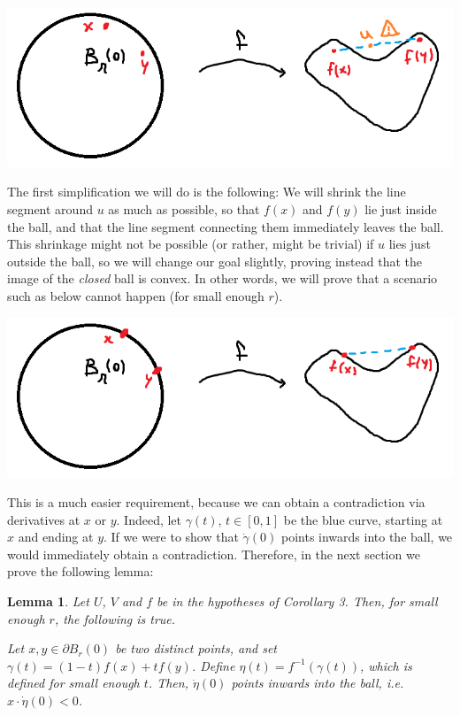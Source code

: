 \documentclass{article}
\newtheorem{lemma}{Lemma}
\theoremstyle{nonumberplain}
\newcommand{\corthree}{Corollary 3}
\begin{document}
\includegraphics[width=\linewidth]{c3i1}

The first simplification we will do is the following: We will shrink the line segment around $u$ as much as possible, so that $f(x)$ and $f(y)$ lie just inside the ball, and that the line segment connecting them immediately leaves the ball. This shrinkage might not be possible (or rather, might be trivial) if $u$ lies just outside the ball, so we will change our goal slightly, proving instead that the image of the \emph{closed} ball is convex. In other words, we will prove that a scenario such as below cannot happen (for small enough $r$).

\includegraphics[width=\linewidth]{c3i2}

This is a much easier requirement, because we can obtain a contradiction via derivatives at $x$ or $y$. Indeed, let $\gamma(t)$, $t \in [0,1]$ be the blue curve, starting at $x$ and ending at $y$. If we were to show that $\dot\gamma(0)$ points inwards into the ball, we would immediately obtain a contradiction. Therefore, in the next section we prove the following lemma:

\begin{lemma}\label{gointoball}
Let $U$, $V$ and $f$ be in the hypotheses of \corthree. Then, for small enough $r$, the following is true.

Let $x, y \in \partial B_r(0)$ be two distinct points, and set $\gamma(t) = (1-t) f(x) + t f(y)$. Define $\eta(t) = f^{-1}(\gamma(t))$, which is defined for small enough $t$. Then, $\dot \eta(0)$ points inwards into the ball, i.e. $x \cdot \dot \eta(0) < 0$.
\end{lemma}
\end{document}
